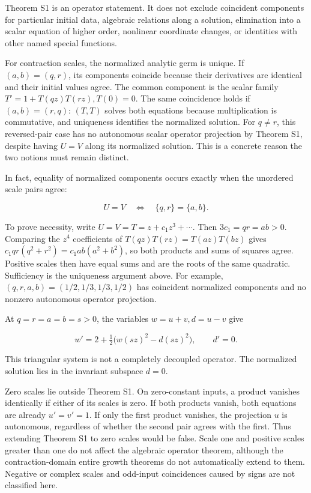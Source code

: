 Theorem S1 is an operator statement. It does not exclude coincident
components for particular initial data, algebraic relations along a
solution, elimination into a scalar equation of higher order, nonlinear
coordinate changes, or identities with other named special functions.

For contraction scales, the normalized analytic germ is unique. If
\((a,b)=(q,r)\), its components coincide because their derivatives are
identical and their initial values agree. The common component is the
scalar family \(T'=1+T(qz)T(rz),T(0)=0\). The same coincidence holds if
\((a,b)=(r,q)\): \((T,T)\) solves both equations because multiplication
is commutative, and uniqueness identifies the normalized solution. For
\(q\ne r\), this reversed-pair case has no autonomous scalar operator
projection by Theorem S1, despite having \(U=V\) along its normalized
solution. This is a concrete reason the two notions must remain
distinct.

In fact, equality of normalized components occurs exactly when the
unordered scale pairs agree:

\[
U=V\quad\Longleftrightarrow\quad\{q,r\}=\{a,b\}.
\tag{S7}
\]

To prove necessity, write \(U=V=T=z+c_1z^3+\cdots\). Then
\(3c_1=qr=ab>0\). Comparing the \(z^4\) coefficients of
\(T(qz)T(rz)=T(az)T(bz)\) gives \(c_1qr(q^2+r^2)=c_1ab(a^2+b^2)\), so
both products and sums of squares agree. Positive scales then have equal
sums and are the roots of the same quadratic. Sufficiency is the
uniqueness argument above. For example, \((q,r,a,b)=(1/2,1/3,1/3,1/2)\)
has coincident normalized components and no nonzero autonomous operator
projection.

At \(q=r=a=b=s>0\), the variables \(w=u+v,d=u-v\) give

\[
w'=2+\tfrac12\bigl(w(sz)^2-d(sz)^2\bigr),\qquad d'=0.
\]

This triangular system is not a completely decoupled operator. The
normalized solution lies in the invariant subspace \(d=0\).

Zero scales lie outside Theorem S1. On zero-constant inputs, a product
vanishes identically if either of its scales is zero. If both products
vanish, both equations are already \(u'=v'=1\). If only the first
product vanishes, the projection \(u\) is autonomous, regardless of
whether the second pair agrees with the first. Thus extending Theorem S1
to zero scales would be false. Scale one and positive scales greater
than one do not affect the algebraic operator theorem, although the
contraction-domain entire growth theorems do not automatically extend to
them. Negative or complex scales and odd-input coincidences caused by
signs are not classified here.

